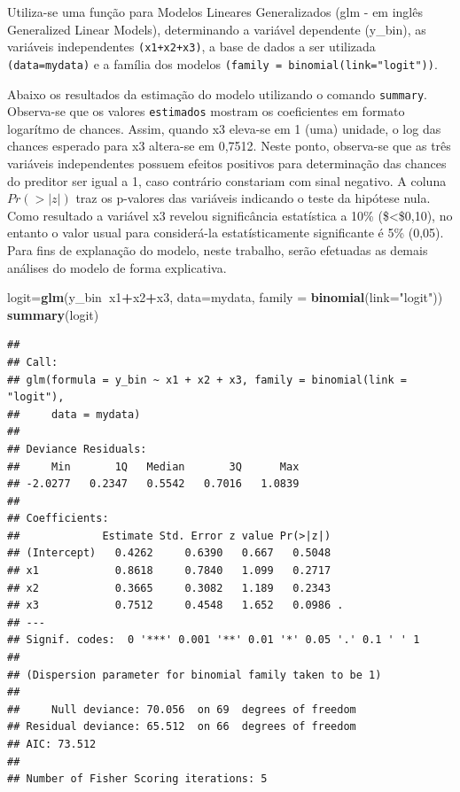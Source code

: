 \documentclass[12pt,brazil,]{book}
\newenvironment{Shaded}{\begin{snugshade}}{\end{snugshade}}
\newcommand{\DataTypeTok}[1]{\textcolor[rgb]{0.13,0.29,0.53}{#1}}
\newcommand{\KeywordTok}[1]{\textcolor[rgb]{0.13,0.29,0.53}{\textbf{#1}}}
\newcommand{\NormalTok}[1]{#1}
\newcommand{\OperatorTok}[1]{\textcolor[rgb]{0.81,0.36,0.00}{\textbf{#1}}}
\newcommand{\StringTok}[1]{\textcolor[rgb]{0.31,0.60,0.02}{#1}}
\begin{document}
Utiliza-se uma função para Modelos Lineares Generalizados (glm - em
inglês Generalized Linear Models), determinando a variável dependente
(y\_bin), as variáveis independentes \texttt{(x1+x2+x3)}, a base de
dados a ser utilizada \texttt{(data=mydata)} e a família dos modelos
\texttt{(family\ =\ binomial(link="logit"))}.

Abaixo os resultados da estimação do modelo utilizando o comando
\texttt{summary}. Observa-se que os valores \texttt{estimados} mostram
os coeficientes em formato logarítmo de chances. Assim, quando x3
eleva-se em 1 (uma) unidade, o log das chances esperado para x3
altera-se em 0,7512. Neste ponto, observa-se que as três variáveis
independentes possuem efeitos positivos para determinação das chances do
preditor ser igual a 1, caso contrário constariam com sinal negativo. A
coluna \(Pr(>|z|)\) traz os p-valores das variáveis indicando o teste da
hipótese nula. Como resultado a variável x3 revelou significância
estatística a 10\% (\$\textless{}\$0,10), no entanto o valor usual para
considerá-la estatísticamente significante é 5\% (0,05). Para fins de
explanação do modelo, neste trabalho, serão efetuadas as demais análises
do modelo de forma explicativa.

\begin{Shaded}
\begin{Highlighting}[]
\NormalTok{logit=}\KeywordTok{glm}\NormalTok{(y_bin}\OperatorTok{~}\NormalTok{x1}\OperatorTok{+}\NormalTok{x2}\OperatorTok{+}\NormalTok{x3, }\DataTypeTok{data=}\NormalTok{mydata, }\DataTypeTok{family =} \KeywordTok{binomial}\NormalTok{(}\DataTypeTok{link=}\StringTok{"logit"}\NormalTok{))}
\KeywordTok{summary}\NormalTok{(logit)}
\end{Highlighting}
\end{Shaded}

\begin{verbatim}
## 
## Call:
## glm(formula = y_bin ~ x1 + x2 + x3, family = binomial(link = "logit"), 
##     data = mydata)
## 
## Deviance Residuals: 
##     Min       1Q   Median       3Q      Max  
## -2.0277   0.2347   0.5542   0.7016   1.0839  
## 
## Coefficients:
##             Estimate Std. Error z value Pr(>|z|)  
## (Intercept)   0.4262     0.6390   0.667   0.5048  
## x1            0.8618     0.7840   1.099   0.2717  
## x2            0.3665     0.3082   1.189   0.2343  
## x3            0.7512     0.4548   1.652   0.0986 .
## ---
## Signif. codes:  0 '***' 0.001 '**' 0.01 '*' 0.05 '.' 0.1 ' ' 1
## 
## (Dispersion parameter for binomial family taken to be 1)
## 
##     Null deviance: 70.056  on 69  degrees of freedom
## Residual deviance: 65.512  on 66  degrees of freedom
## AIC: 73.512
## 
## Number of Fisher Scoring iterations: 5
\end{verbatim}
\end{document}
